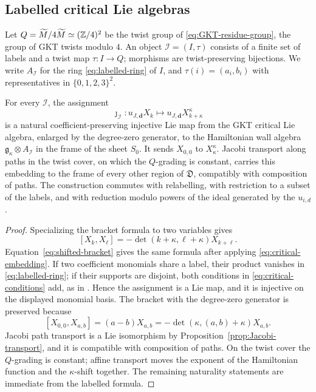 \subsection{Labelled critical Lie algebras}
\label{subsec:labelled-critical}

Let $Q=\widetilde M/4\widetilde M\simeq(\mathbb Z/4)^2$ be the twist group of
\eqref{eq:GKT-residue-group}, the group of GKT twists modulo $4$.  An
object $\mathcal I=(I,\tau)$ consists of a finite set of labels and a twist
map $\tau:I\to Q$; morphisms are twist-preserving bijections.  We write $A_{\mathcal I}$ for the ring
\eqref{eq:labelled-ring} of $I$, and $\tau(i)=(a_i,b_i)$ with representatives
in $\{0,1,2,3\}^2$.

\begin{theorem}
\label{thm:critical-embedding}
For every $\mathcal I$, the assignment
\begin{equation}\label{eq:critical-embedding}
 \jmath_{\mathcal I}:
 u_{J,\mathbf d}X_k
 \longmapsto
 u_{J,\mathbf d}X_{k+\kappa}^{\kappa}
\end{equation}
is a natural coefficient-preserving injective Lie map from the GKT critical Lie
algebra, enlarged by the degree-zero generator, to the Hamiltonian wall
algebra $\mathfrak g_\kappa\otimes A_{\mathcal I}$ in the frame of the sheet
$S_0$.  It sends $X_{0,0}$ to $X_\kappa^\kappa$.  Jacobi transport along
paths in the twist cover, on which the $Q$-grading is constant,
carries this embedding to the frame of every other region of $\mathfrak D$,
compatibly with composition of paths.  The construction commutes with
relabelling, with restriction to a subset of the labels, and with reduction
modulo powers of the ideal generated by the $u_{i,d}$.
\end{theorem}

\begin{proof}
Specializing the bracket formula \cite[(4.17)]{grossetal2022open} to two
variables gives
\[
 [X_k,X_\ell]
 =-\det(k+\kappa,\ell+\kappa)X_{k+\ell}.
\]
Equation~\eqref{eq:shifted-bracket} gives the same formula after applying
\eqref{eq:critical-embedding}.  If two coefficient monomials share a label,
their product vanishes in \eqref{eq:labelled-ring}; if their supports are
disjoint, both conditions in \eqref{eq:critical-conditions} add, as in
\cite[Prop.~4.25]{grossetal2022open}.  Hence the
assignment is a Lie map, and it is injective on the displayed monomial
basis.  The bracket with the degree-zero generator is preserved because
\[
 [X_{0,0},X_{a,b}]=(a-b)X_{a,b}
 =-\det(\kappa,(a,b)+\kappa)X_{a,b}.
\]
Jacobi path transport is a Lie isomorphism by
Proposition~\ref{prop:Jacobi-transport}, and it is compatible with
composition of paths.  On the twist cover the
$Q$-grading is constant; affine transport moves the exponent of the
Hamiltonian function and the $\kappa$-shift together.  The remaining naturality statements are
immediate from the labelled formula.
\end{proof}

